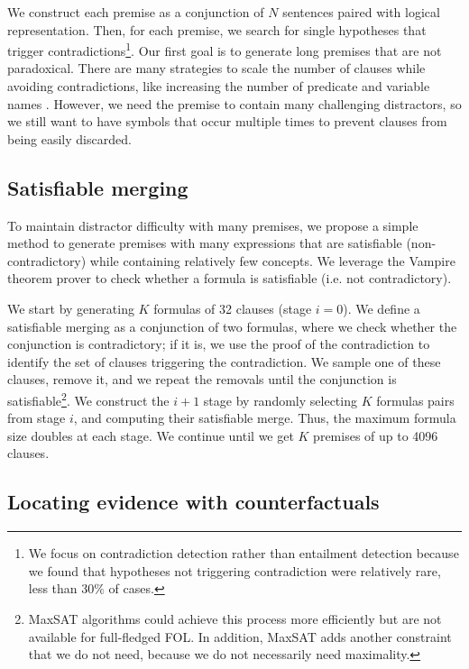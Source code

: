 \documentclass[11pt]{article}
\begin{document}
We construct each premise as a conjunction of $N$ sentences paired with logical representation.
Then, for each premise, we search for single hypotheses that trigger contradictions\footnote{We focus on contradiction detection rather than entailment detection because we found that hypotheses not triggering contradiction were relatively rare, less than $30\%$ of cases.}. Our first goal is to generate long premises that are not paradoxical. There are many strategies to scale the number of clauses while avoiding contradictions, like increasing the number of predicate and variable names \cite{monasson1999determining}. However, we need the premise to contain many challenging distractors, so we still want to have symbols that occur multiple times to prevent clauses from being easily discarded.

\subsection{Satisfiable merging}

To maintain distractor difficulty with many premises, we propose a simple method to generate premises with many expressions that are satisfiable (non-contradictory) while containing relatively few concepts.
We leverage the Vampire \cite{reger2022vampire} theorem prover to check whether a formula is satisfiable (i.e. not contradictory). 

We start by generating $K$ formulas of 32 clauses (stage $i=0$).  We define a satisfiable merging as a conjunction of two formulas, where we check whether the conjunction is contradictory; if it is, we use the proof of the contradiction to identify the set of clauses triggering the contradiction. We sample one of these clauses, remove it, and we repeat the removals until the conjunction is satisfiable\footnote{MaxSAT algorithms could achieve this process more efficiently but are not available for full-fledged FOL. In addition, MaxSAT adds another constraint that we do not need, because we do not necessarily need maximality.}. We construct the $i+1$ stage by randomly selecting $K$ formulas pairs from stage $i$, and computing their satisfiable merge. Thus, the maximum formula size doubles at each stage. We continue until we get $K$ premises of up to 4096 clauses.


\subsection{Locating evidence with counterfactuals}
\end{document}
